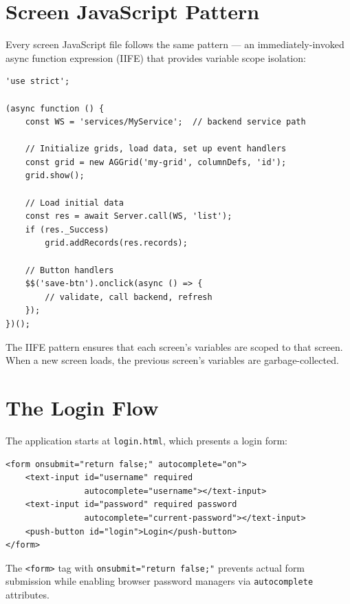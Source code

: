 \section{Screen JavaScript Pattern}
\label{sec:fe-screen-js}

Every screen JavaScript file follows the same pattern --- an immediately-invoked async function expression (IIFE) that provides variable scope isolation:

\begin{lstlisting}[style=javascript]
'use strict';

(async function () {
    const WS = 'services/MyService';  // backend service path

    // Initialize grids, load data, set up event handlers
    const grid = new AGGrid('my-grid', columnDefs, 'id');
    grid.show();

    // Load initial data
    const res = await Server.call(WS, 'list');
    if (res._Success)
        grid.addRecords(res.records);

    // Button handlers
    $$('save-btn').onclick(async () => {
        // validate, call backend, refresh
    });
})();
\end{lstlisting}

\begin{tipbox}
The IIFE pattern ensures that each screen's variables are scoped to that screen.  When a new screen loads, the previous screen's variables are garbage-collected.
\end{tipbox}

\section{The Login Flow}
\label{sec:fe-login}

The application starts at \texttt{login.html}, which presents a login form:

\begin{lstlisting}[style=html]
<form onsubmit="return false;" autocomplete="on">
    <text-input id="username" required
                autocomplete="username"></text-input>
    <text-input id="password" required password
                autocomplete="current-password"></text-input>
    <push-button id="login">Login</push-button>
</form>
\end{lstlisting}

\noindent
The \texttt{<form>} tag with \texttt{onsubmit="return false;"} prevents actual form submission while enabling browser password managers via \texttt{autocomplete} attributes.

